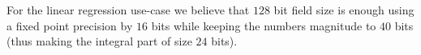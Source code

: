 








For the linear regression use-case we believe that $128$ bit field size is
enough using a fixed point precision by $16$ bits while keeping the numbers
magnitude to $40$ bits (thus making the integral part of size $24$ bits).


